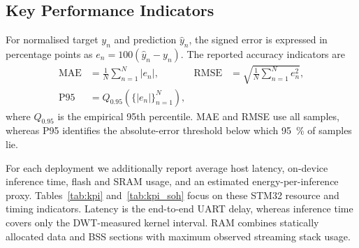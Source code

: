 \documentclass[final,3p,times]{elsarticle}
\begin{document}
\subsection{Key Performance Indicators}
For normalised target $y_n$ and prediction $\hat{y}_n$, the signed error is expressed in percentage points as $e_n=100(\hat{y}_n-y_n)$. The reported accuracy indicators are
\begin{align}
    \mathrm{MAE} &= \frac{1}{N}\sum_{n=1}^{N}|e_n|, &
    \mathrm{RMSE} &= \sqrt{\frac{1}{N}\sum_{n=1}^{N}e_n^2},\label{eq:error_metrics}\\
    \mathrm{P95} &= Q_{0.95}\!\left(\{|e_n|\}_{n=1}^{N}\right),
\end{align}
where $Q_{0.95}$ is the empirical 95th percentile. MAE and RMSE use all samples, whereas P95 identifies the absolute-error threshold below which 95~\% of samples lie.

For each deployment we additionally report average host latency, on-device inference time, flash and SRAM usage, and an estimated energy-per-inference proxy. Tables~\ref{tab:kpi} and~\ref{tab:kpi_soh} focus on these STM32 resource and timing indicators. Latency is the end-to-end UART delay, whereas inference time covers only the DWT-measured kernel interval. RAM combines statically allocated data and BSS sections with maximum observed streaming stack usage.
\end{document}

